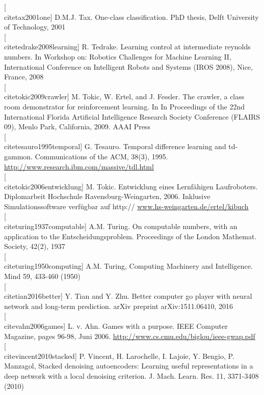 \documentclass[10pt]{book}
\begin{document}
[\\cite{tax2001one}] D.M.J. Tax. One-class classification. PhD thesis, Delft University of Technology, 2001\\[0pt]
[\\cite{tedrake2008learning}] R. Tedrake. Learning control at intermediate reynolds numbers. In Workshop on: Robotics Challenges for Machine Learning II, International Conference on Intelligent Robots and Systems (IROS 2008), Nice, France, 2008\\[0pt]
[\\cite{tokic2009crawler}] M. Tokic, W. Ertel, and J. Fessler. The crawler, a class room demonstrator for reinforcement learning. In In Proceedings of the 22nd International Florida Artificial Intelligence Research Society Conference (FLAIRS 09), Menlo Park, California, 2009. AAAI Press\\[0pt]
[\\cite{tesauro1995temporal}] G. Tesauro. Temporal difference learning and td-gammon. Communications of the ACM, 38(3), 1995. \href{http://www.research.ibm.com/massive/tdl.html}{http://www.research.ibm.com/massive/tdl.html}\\[0pt]
[\\cite{tokic2006entwicklung}] M. Tokic. Entwicklung eines Lernfähigen Laufroboters. Diplomarbeit Hochschule Ravensburg-Weingarten, 2006. Inklusive Simulationssoftware verfügbar auf http:// \href{http://www.hs-weingarten.de/ertel/kibuch}{www.hs-weingarten.de/ertel/kibuch}\\[0pt]
[\\cite{turing1937computable}] A.M. Turing. On computable numbers, with an application to the Entscheidungsproblem. Proceedings of the London Mathemat. Society, 42(2), 1937\\[0pt]
[\\cite{turing1950computing}] A.M. Turing, Computing Machinery and Intelligence. Mind 59, 433-460 (1950)\\[0pt]
[\\cite{tian2016better}] Y. Tian and Y. Zhu. Better computer go player with neural network and long-term prediction. arXiv preprint arXiv:1511.06410, 2016\\[0pt]
[\\cite{vahn2006games}] L. v. Ahn. Games with a purpose. IEEE Computer Magazine, pages 96-98, Juni 2006. \href{http://www.cs.cmu.edu/biglou/ieee-gwap.pdf}{http://www.cs.cmu.edu/biglou/ieee-gwap.pdf}\\[0pt]
[\\cite{vincent2010stacked}] P. Vincent, H. Larochelle, I. Lajoie, Y. Bengio, P. Manzagol, Stacked denoising autoencoders: Learning useful representations in a deep network with a local denoising criterion. J. Mach. Learn. Res. 11, 3371-3408 (2010)\\[0pt]
\end{document}
